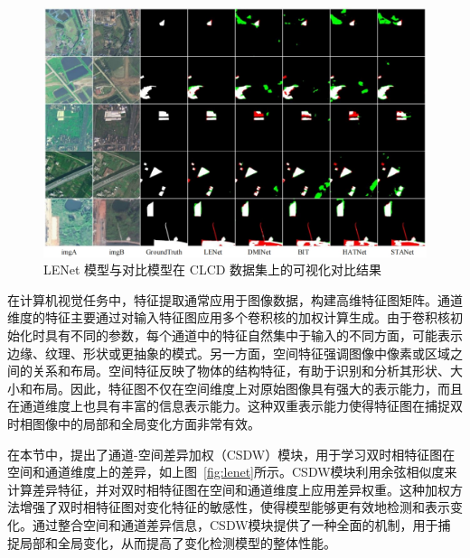 \begin{figure}[!htb]
  \centering
  \includegraphics[width=\textwidth]{paper_figures/基于双时相遥感影像特征交互的变化检测算法研究/LENet/lenet_clcd.png}
  \caption{LENet 模型与对比模型在 CLCD 数据集上的可视化对比结果}
  \label{fig:lenet_clcd}
\end{figure}

在计算机视觉任务中，特征提取通常应用于图像数据，构建高维特征图矩阵。通道维度的特征主要通过对输入特征图应用多个卷积核的加权计算生成。由于卷积核初始化时具有不同的参数，每个通道中的特征自然集中于输入的不同方面，可能表示边缘、纹理、形状或更抽象的模式。另一方面，空间特征强调图像中像素或区域之间的关系和布局。空间特征反映了物体的结构特征，有助于识别和分析其形状、大小和布局。因此，特征图不仅在空间维度上对原始图像具有强大的表示能力，而且在通道维度上也具有丰富的信息表示能力。这种双重表示能力使得特征图在捕捉双时相图像中的局部和全局变化方面非常有效。

在本节中，提出了通道-空间差异加权（CSDW）模块，用于学习双时相特征图在空间和通道维度上的差异，如上图~\ref{fig:lenet}所示。CSDW模块利用余弦相似度来计算差异特征，并对双时相特征图在空间和通道维度上应用差异权重。这种加权方法增强了双时相特征图对变化特征的敏感性，使得模型能够更有效地检测和表示变化。通过整合空间和通道差异信息，CSDW模块提供了一种全面的机制，用于捕捉局部和全局变化，从而提高了变化检测模型的整体性能。

